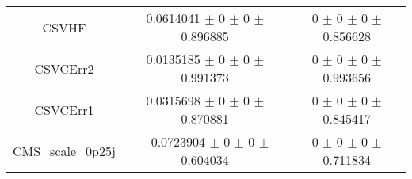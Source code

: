 \begin{table}
\begin{tabular}{ccc}
CSVHF & \num{0.0614041} $\pm$ \num{0} $\pm$ \num{0} $\pm$ \num{0.896885} & \num{0} $\pm$ \num{0} $\pm$ \num{0} $\pm$ \num{0.856628}\\
CSVCErr2 & \num{0.0135185} $\pm$ \num{0} $\pm$ \num{0} $\pm$ \num{0.991373} & \num{0} $\pm$ \num{0} $\pm$ \num{0} $\pm$ \num{0.993656}\\
CSVCErr1 & \num{0.0315698} $\pm$ \num{0} $\pm$ \num{0} $\pm$ \num{0.870881} & \num{0} $\pm$ \num{0} $\pm$ \num{0} $\pm$ \num{0.845417}\\
CMS\_scale\_0p25j & \num{-0.0723904} $\pm$ \num{0} $\pm$ \num{0} $\pm$ \num{0.604034} & \num{0} $\pm$ \num{0} $\pm$ \num{0} $\pm$ \num{0.711834}\\
\bottomrule
\end{tabular}
\end{table}